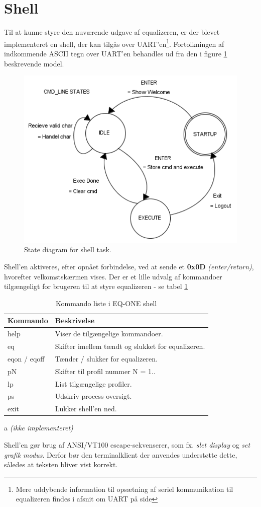 \section{Shell}
Til at kunne styre den nuværende udgave af equalizeren, er der blevet implementeret en shell, der kan tilgås over UART'en\footnote{Mere uddybende information til opsætning af seriel kommunikation til equalizeren findes i afsnit om UART på side \pageref{subsec:uart}}.
Fortolkningen af indkommende ASCII tegn over UART'en behandles ud fra den i figure \ref{fig:shell_task} beskrevende model.

\begin{figure}[h!]
	\centering
	\includegraphics[width=.6\textwidth]{billeder/cmd_states.png}
	\caption{State diagram for shell task.}
	\label{fig:shell_task}
\end{figure}

Shell'en aktiveres, efter opnået forbindelse, ved at sende et \textbf{0x0D} \textit{(enter/return)}, hvorefter velkomstskærmen vises.
Der er et lille udvalg af kommandoer tilgængeligt for brugeren til at styre equalizeren - se tabel \ref{tab:shell_cmd} 

\begin{table}[h!]
	\caption{Kommando liste i EQ-ONE shell}
	\label{tab:shell_cmd}
	\begin{threeparttable}
		\begin{tabular}{l p{}}
			\toprule
			\textbf{Kommando}      & \textbf{Beskrivelse}   \\ 
			\midrule
			help		& Viser de tilgængelige kommandoer. \\
			eq       	& Skifter imellem tændt og slukket for equalizeren. \\
			eqon / eqoff & Tænder / slukker for equalizeren. \tnote{a}\\
			pN			& Skifter til profil nummer N = 1.. \\
			lp			& List tilgængelige profiler.\tnote{a}\\
			ps		    & Udskriv process oversigt. \\
			exit 		& Lukker shell'en ned. \\
			\bottomrule
		\end{tabular}
		
		\begin{tablenotes}
			\item[a] \textit{(ikke implementeret)}
		\end{tablenotes}
	\end{threeparttable}
\end{table}

Shell'en gør brug af ANSI/VT100 escape-sekvenserer, som fx. \textit{slet display} og \textit{set grafik modus}.
Derfor bør den terminalklient der anvendes understøtte dette, således at teksten bliver vist korrekt.







